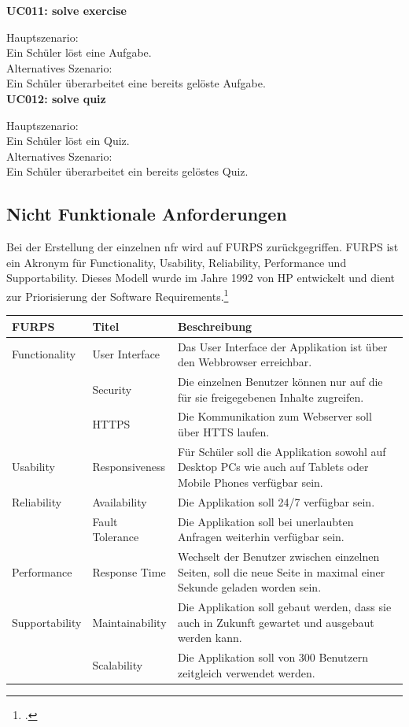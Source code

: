 \noindent \textbf{UC011: solve exercise}

\noindent Hauptszenario: \\
Ein Schüler löst eine Aufgabe. \\

\noindent Alternatives Szenario: \\
Ein Schüler überarbeitet eine bereits gelöste Aufgabe. \\


\noindent \textbf{UC012: solve quiz}

\noindent Hauptszenario: \\
Ein Schüler löst ein Quiz. \\

\noindent Alternatives Szenario: \\
Ein Schüler überarbeitet ein bereits gelöstes Quiz. \\


\subsection{Nicht Funktionale Anforderungen}
Bei der Erstellung der einzelnen \gls{nfr} wird auf FURPS zurückgegriffen. FURPS ist ein Akronym für Functionality, Usability, Reliability, Performance und Supportability. Dieses Modell wurde im Jahre 1992 von HP entwickelt und dient zur Priorisierung der Software Requirements.\footcite{furps_description}

\begin{table}[h]
	\centering
	\begin{tabu} to 0.9\textwidth {l l X}
	\toprule
	FURPS & Titel & Beschreibung \\ 
	\midrule
	Functionality & User Interface & Das User Interface der Applikation ist über den Webbrowser erreichbar. \\ 
	& Security & Die einzelnen Benutzer können nur auf die für sie freigegebenen Inhalte zugreifen. \\
	& HTTPS & Die Kommunikation zum Webserver soll über HTTS laufen. \\
	\midrule
	Usability & Responsiveness & Für Schüler soll die Applikation sowohl auf Desktop PCs wie auch auf Tablets oder Mobile Phones verfügbar sein. \\
	\midrule
	Reliability & Availability & Die Applikation soll 24/7 verfügbar sein. \\
	 & Fault Tolerance & Die Applikation soll bei unerlaubten Anfragen weiterhin verfügbar sein. \\
	\midrule
	Performance & Response Time & Wechselt der Benutzer zwischen einzelnen Seiten, soll die neue Seite in maximal einer Sekunde geladen worden sein.\\
	\midrule
	Supportability & Maintainability & Die Applikation soll gebaut werden, dass sie auch in Zukunft gewartet und ausgebaut werden kann. \\
	 & Scalability & Die Applikation soll von 300 Benutzern zeitgleich verwendet werden. \\
	\bottomrule
	\end{tabu}
\end{table}

